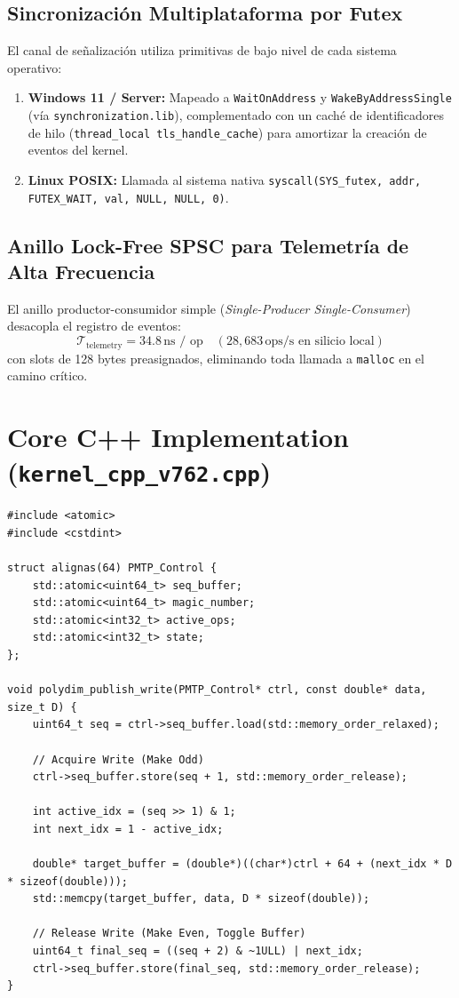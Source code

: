 \subsection{Sincronización Multiplataforma por Futex}
El canal de señalización utiliza primitivas de bajo nivel de cada sistema operativo:
\begin{enumerate}
    \item \textbf{Windows 11 / Server:} Mapeado a \texttt{WaitOnAddress} y \texttt{WakeByAddressSingle} (vía \texttt{synchronization.lib}), complementado con un caché de identificadores de hilo (\texttt{thread\_local tls\_handle\_cache}) para amortizar la creación de eventos del kernel.
    \item \textbf{Linux POSIX:} Llamada al sistema nativa \texttt{syscall(SYS\_futex, addr, FUTEX\_WAIT, val, NULL, NULL, 0)}.
\end{enumerate}

\subsection{Anillo Lock-Free SPSC para Telemetría de Alta Frecuencia}
El anillo productor-consumidor simple (\emph{Single-Producer Single-Consumer}) desacopla el registro de eventos:
\begin{equation}
\mathcal{T}_{\text{telemetry}} = 34.8\,\text{ns / op} \quad (28{,}683\,\text{ops/s en silicio local})
\end{equation}
con slots de 128 bytes preasignados, eliminando toda llamada a \texttt{malloc} en el camino crítico.

\section{Core C++ Implementation (\texttt{kernel\_cpp\_v762.cpp})}

\begin{verbatim}
#include <atomic>
#include <cstdint>

struct alignas(64) PMTP_Control {
    std::atomic<uint64_t> seq_buffer;
    std::atomic<uint64_t> magic_number;
    std::atomic<int32_t> active_ops;
    std::atomic<int32_t> state;
};

void polydim_publish_write(PMTP_Control* ctrl, const double* data, size_t D) {
    uint64_t seq = ctrl->seq_buffer.load(std::memory_order_relaxed);
    
    // Acquire Write (Make Odd)
    ctrl->seq_buffer.store(seq + 1, std::memory_order_release);
    
    int active_idx = (seq >> 1) & 1;
    int next_idx = 1 - active_idx;
    
    double* target_buffer = (double*)((char*)ctrl + 64 + (next_idx * D * sizeof(double)));
    std::memcpy(target_buffer, data, D * sizeof(double));
    
    // Release Write (Make Even, Toggle Buffer)
    uint64_t final_seq = ((seq + 2) & ~1ULL) | next_idx;
    ctrl->seq_buffer.store(final_seq, std::memory_order_release);
}
\end{verbatim}